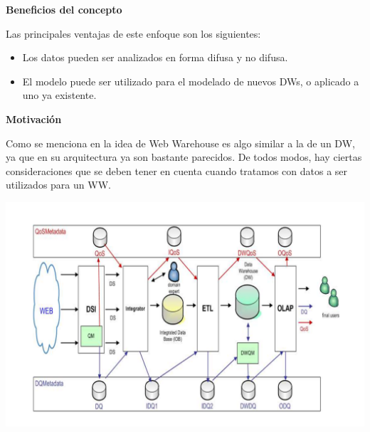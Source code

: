 \documentclass{fancyslides}
\begin{document}
\begin{frame}
\misc
{
\textbf{Beneficios del concepto}
\newline

Las principales ventajas de este enfoque son los siguientes:
\begin{itemize}
  \item Los datos pueden ser analizados en forma difusa y no difusa.
  \item El modelo puede ser utilizado para el modelado de nuevos DWs, o aplicado a uno ya existente.
\end{itemize}
}
\end{frame}


\begin{frame}
\end{frame}

\begin{frame}
\misc
{ \textbf{Motivación}
\newline

\justifying Como se menciona en \cite{WWPaper} la idea de Web Warehouse es algo similar a la de un DW, ya que en su arquitectura ya son bastante parecidos. De todos modos, hay ciertas consideraciones que se deben tener en cuenta cuando tratamos con datos a ser utilizados para un WW.

}
\end{frame}



\begin{frame}
\end{frame}

\begin{frame}
\misc
{

\begin{center}
  \includegraphics[scale=0.15]{arquitectura}
\end{center}

}
\end{frame}
\end{document}
